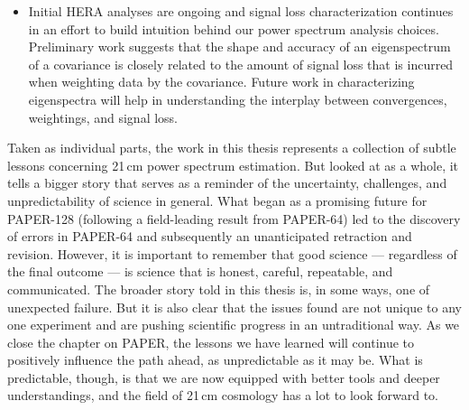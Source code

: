 \begin{itemize}
\item Initial HERA analyses are ongoing and signal loss characterization continues in an effort to build intuition behind our power spectrum analysis choices. Preliminary work suggests that the shape and accuracy of an eigenspectrum of a covariance is closely related to the amount of signal loss that is incurred when weighting data by the covariance. Future work in characterizing eigenspectra will help in understanding the interplay between convergences, weightings, and signal loss.
\end{itemize}

Taken as individual parts, the work in this thesis represents a collection of subtle lessons concerning 21\,cm power spectrum estimation. But looked at as a whole, it tells a bigger story that serves as a reminder of the uncertainty, challenges, and unpredictability of science in general. What began as a promising future for PAPER-128 (following a field-leading result from PAPER-64) led to the discovery of errors in PAPER-64 and subsequently an unanticipated retraction and revision. However, it is important to remember that good science --- regardless of the final outcome --- is science that is honest, careful, repeatable, and communicated. The broader story told in this thesis is, in some ways, one of unexpected failure. But it is also clear that the issues found are not unique to any one experiment and are pushing scientific progress in an untraditional way. As we close the chapter on PAPER, the lessons we have learned will continue to positively influence the path ahead, as unpredictable as it may be. What is predictable, though, is that we are now equipped with better tools and deeper understandings, and the field of 21\,cm cosmology has a lot to look forward to. 




